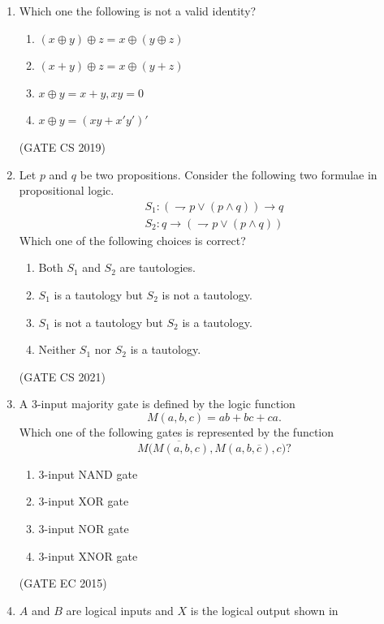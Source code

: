 \begin{enumerate}[label=\arabic*.,ref=\theenumi]
\begin{multicols}{4}
\begin{enumerate}
    \item {}
\end{enumerate}
	\end{multicols}
%
% 
\item 
Which one the following is not a valid identity?
\begin{enumerate}
 \item $ (x\oplus y)\oplus z = x\oplus (y\oplus z)$
 \item $ (x + y)\oplus z = x\oplus (y + z)$
 \item $ x\oplus y = x + y, xy = 0$
 \item $ x\oplus y = (xy + x'y')'$
\end{enumerate}
\hfill{(GATE CS 2019)}
        \item Let $p$ and $q$ be two propositions. Consider the following two formulae in propositional logic.
			\begin{align*}
				 S_1 : ( \rightharpoondown p \vee (p \wedge q))\rightarrow q \\
				 S_2 : q\rightarrow(\rightharpoondown p \vee (p \wedge q))
			\end{align*}
        Which one of the following choices is correct?
		\begin{enumerate}
			\item Both $S_1$ and $S_2$ are tautologies.
			\item $S_1$ is a tautology but $S_2$ is not a tautology.
			\item $S_1$ is not a tautology but $S_2$ is a tautology.
			\item Neither $S_1$ nor $S_2$ is a tautology.
		\end{enumerate}
		                                          \hfill(GATE CS 2021)
\item A 3-input majority gate is defined by the logic function 
	$$M(a, b, c) = ab + bc + ca.$$ Which one of the following gates is represented by the function $$M\overline{(M(a, b, c)}, M(a, b, \overline{c}), c)?$$
\begin{enumerate}
    \item 3-input NAND gate 
    \item 3-input XOR gate 
    \item 3-input NOR gate 
    \item 3-input XNOR gate 
\end{enumerate}
    \hfill(GATE EC 2015)
\item $A$ and $B$ are logical inputs and $X$ is the logical output shown in 

\end{enumerate}
